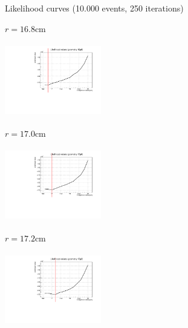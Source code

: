 \documentclass[handout,8 pt]{beamer}
\begin{document}
\begin{frame}{Likelihood curves (10.000 events, 250 iterations)}
\justifying
\begin{minipage}[c]{.32\textwidth}
\begin{exampleblock}{} \begin{center}$r = 16.8$cm\end{center} \end{exampleblock}
\includegraphics[width=4.2cm, height=3.2cm]{figs/likelihood250LowStat/likelihood16p8.pdf} 
\end{minipage}
\begin{minipage}[c]{.32\textwidth}
\begin{exampleblock}{} \begin{center}$r = 17.0$cm\end{center} \end{exampleblock}
\includegraphics[width=4.2cm, height=3.2cm]{figs/likelihood250LowStat/likelihood17p0.pdf} 
\end{minipage}
\begin{minipage}[c]{.32\textwidth}
\begin{exampleblock}{} \begin{center}$r = 17.2$cm\end{center} \end{exampleblock}
\includegraphics[width=4.2cm, height=3.2cm]{figs/likelihood250LowStat/likelihood17p2.pdf} 
\end{minipage}


\end{frame}
\end{document}
